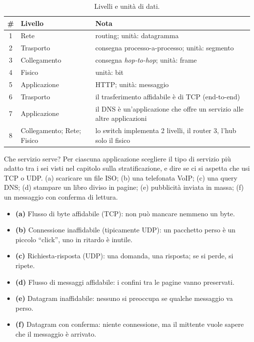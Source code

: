 \svolgimento
\begin{table}[H]
\centering
\begin{tabular}{clp{6.6cm}}
\toprule
\textbf{\#} & \textbf{Livello} & \textbf{Nota} \\
\midrule
1 & Rete & routing; unità: datagramma \\
2 & Trasporto & consegna processo-a-processo; unità: segmento \\
3 & Collegamento & consegna \emph{hop-to-hop}; unità: frame \\
4 & Fisico & unità: bit \\
5 & Applicazione & HTTP; unità: messaggio \\
6 & Trasporto & il trasferimento affidabile è di TCP (end-to-end) \\
7 & Applicazione & il DNS è un'applicazione che offre un servizio alle altre applicazioni \\
8 & Collegamento; Rete; Fisico & lo switch implementa 2 livelli, il router 3, l'hub solo il fisico \\
\bottomrule
\end{tabular}
\caption{Livelli e unità di dati.}
\end{table}

\begin{esercizio}{Che servizio serve?}
Per ciascuna applicazione scegliere il tipo di servizio più adatto tra i sei visti nel capitolo sulla stratificazione, e dire
se ci si aspetta che usi TCP o UDP.
(a) scaricare un file ISO; (b) una telefonata VoIP; (c) una query DNS; (d) stampare un libro diviso in pagine;
(e) pubblicità inviata in massa; (f) un messaggio con conferma di lettura.
\end{esercizio}

\svolgimento
\begin{itemize}
    \item \textbf{(a)} Flusso di byte affidabile (TCP): non può mancare nemmeno un byte.
    \item \textbf{(b)} Connessione inaffidabile (tipicamente UDP): un pacchetto perso è un piccolo ``click'', uno in ritardo è inutile.
    \item \textbf{(c)} Richiesta-risposta (UDP): una domanda, una risposta; se si perde, si ripete.
    \item \textbf{(d)} Flusso di messaggi affidabile: i confini tra le pagine vanno preservati.
    \item \textbf{(e)} Datagram inaffidabile: nessuno si preoccupa se qualche messaggio va perso.
    \item \textbf{(f)} Datagram con conferma: niente connessione, ma il mittente vuole sapere che il messaggio è arrivato.
\end{itemize}

